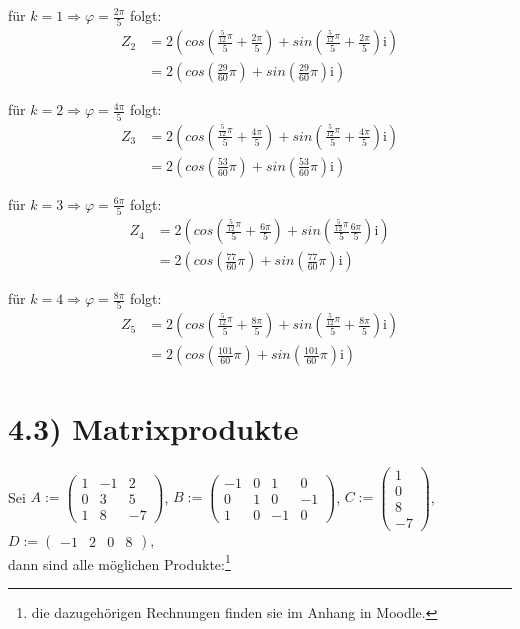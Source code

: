 \documentclass[titlepage]{article}
\begin{document}
	für $k=1\Rightarrow\varphi=\frac{2\pi}{5}$ folgt:
	\begin{align*}
		Z_2&=2\left(cos(\frac{\frac{5}{12}\pi}{5}+\frac{2\pi}{5})+sin(\frac{\frac{5}{12}\pi}{5}+\frac{2\pi}{5})\mathrm{i}\right)\\
		&=2(cos(\frac{29}{60}\pi)+sin(\frac{29}{60}\pi)\mathrm{i})
	\end{align*}

	für $k=2\Rightarrow\varphi=\frac{4\pi}{5}$ folgt:
	\begin{align*}
		Z_3&=2\left(cos(\frac{\frac{5}{12}\pi}{5}+\frac{4\pi}{5})+sin(\frac{\frac{5}{12}\pi}{5}+\frac{4\pi}{5})\mathrm{i}\right)\\
		&=2(cos(\frac{53}{60}\pi)+sin(\frac{53}{60}\pi)\mathrm{i})
	\end{align*}

	für $k=3\Rightarrow\varphi=\frac{6\pi}{5}$ folgt:
	\begin{align*}
		Z_4&=2\left(cos(\frac{\frac{5}{12}\pi}{5}+\frac{6\pi}{5})+sin(\frac{\frac{5}{12}\pi}{5}\frac{6\pi}{5})\mathrm{i}\right)\\
		&=2(cos(\frac{77}{60}\pi)+sin(\frac{77}{60}\pi)\mathrm{i})
	\end{align*}

	für $k=4\Rightarrow\varphi=\frac{8\pi}{5}$ folgt:
	\begin{align*}
		Z_5&=2\left(cos(\frac{\frac{5}{12}\pi}{5}+\frac{8\pi}{5})+sin(\frac{\frac{5}{12}\pi}{5}+\frac{8\pi}{5})\mathrm{i}\right)\\
		&=2(cos(\frac{101}{60}\pi)+sin(\frac{101}{60}\pi)\mathrm{i})
	\end{align*}

	\section*{4.3) Matrixprodukte}
		Sei $A:=\left(\begin{array}{ccc}
			1&-1&2\\
			0&3&5\\
			1&8&-7
		\end{array}\right)$, 
		$B:=\left(\begin{array}{cccc}
			-1&0&1&0\\
			0&1&0&-1\\
			1&0&-1&0
		\end{array}\right)$,
		$C:=\left(\begin{array}{c}
			1\\
			0\\
			8\\
			-7
		\end{array}\right)$,
		$D:=\left(\begin{array}{cccc}
			-1&2&0&8
		\end{array}\right)$, \\dann sind alle möglichen Produkte:\footnote{die dazugehörigen Rechnungen finden sie im Anhang in Moodle.}\\
	
\end{document}
